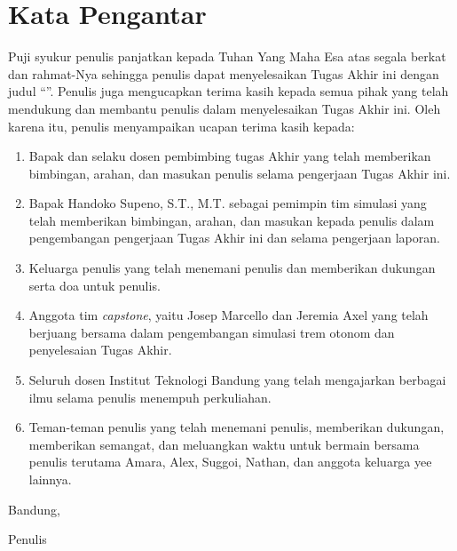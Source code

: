 \chapter*{Kata Pengantar}

Puji syukur penulis panjatkan kepada Tuhan Yang Maha Esa atas segala berkat dan
rahmat-Nya sehingga penulis dapat menyelesaikan Tugas Akhir ini dengan judul
``\thetitle''. Penulis juga mengucapkan terima kasih kepada semua pihak yang
telah mendukung dan membantu penulis dalam menyelesaikan Tugas Akhir ini.
Oleh karena itu, penulis menyampaikan ucapan terima kasih kepada:

\begin{enumerate}
	\item Bapak \advisoronename dan \advisortwoname selaku dosen pembimbing
	tugas Akhir yang telah memberikan bimbingan, arahan, dan masukan penulis
	selama pengerjaan Tugas Akhir ini.
	\item Bapak Handoko Supeno, S.T., M.T. sebagai pemimpin tim simulasi yang
	telah memberikan bimbingan, arahan, dan masukan kepada penulis dalam
	pengembangan pengerjaan Tugas Akhir ini dan selama pengerjaan laporan.
	\item Keluarga penulis yang telah menemani penulis dan memberikan dukungan
	serta doa untuk penulis.
	\item Anggota tim \textit{capstone}, yaitu Josep Marcello dan Jeremia Axel
	yang telah berjuang bersama dalam pengembangan simulasi trem otonom dan
	penyelesaian Tugas Akhir.
	\item Seluruh dosen Institut Teknologi Bandung yang telah mengajarkan berbagai
	ilmu selama penulis menempuh perkuliahan.
	\item Teman-teman penulis yang telah menemani penulis, memberikan dukungan,
	memberikan semangat, dan meluangkan waktu untuk bermain bersama penulis
	terutama Amara, Alex, Suggoi, Nathan, dan anggota keluarga yee lainnya.
\end{enumerate}

\begin{flushright}
	Bandung, \thedate \\
	\vspace{15mm}

	Penulis
\end{flushright}

\clearpage
